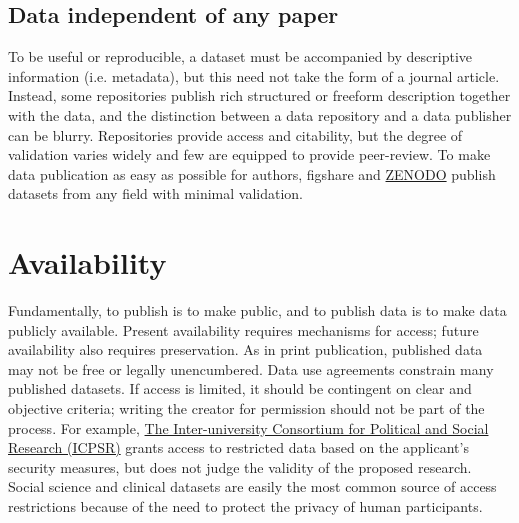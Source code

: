 \documentclass[10pt,twocolumn]{article}
\begin{document}
\subsection*{Data independent of any paper}\label{paper-independent-data}

To be useful or reproducible, a dataset must be accompanied by descriptive information (i.e. metadata)\cite{gray_online_2002}, but this need not take the form of a journal article.
Instead, some repositories publish rich structured or freeform description together with the data, and the distinction between a data repository and a data publisher can be blurry.
Repositories provide access and citability, but the degree of validation varies widely and few are equipped to provide peer-review.
To make data publication as easy as possible for authors, figshare and \href{https://zenodo.org/}{ZENODO} publish datasets from any field with minimal validation.

\section*{Availability}\label{availability}

Fundamentally, to publish is to make public, and to publish data is to make data publicly available.
Present availability requires mechanisms for access; future availability also requires preservation.\cite{beagrie_digital_2008, gray_online_2002}
As in print publication, published data may not be free or legally unencumbered.
Data use agreements constrain many published datasets.
If access is limited, it should be contingent on clear and objective criteria; writing the creator for permission should not be part of the process.
For example, \href{http://www.icpsr.umich.edu/icpsrweb/content/deposit/confidentiality.html}{The Inter-university Consortium for Political and Social Research (ICPSR)} grants access to restricted data based on the applicant's security measures, but does not judge the validity of the proposed research.
Social science and clinical datasets are easily the most common source of access restrictions because of the need to protect the privacy of human participants.
\end{document}
